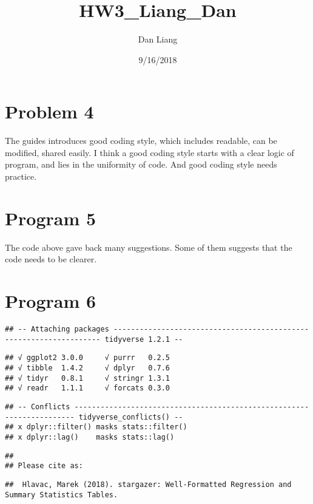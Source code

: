 \documentclass[]{article}
\title{HW3\_Liang\_Dan}
\author{Dan Liang}
\date{9/16/2018}
\begin{document}
\maketitle

\section{Problem 4}\label{problem-4}

The guides introduces good coding style, which includes readable, can be
modified, shared easily. I think a good coding style starts with a clear
logic of program, and lies in the uniformity of code. And good coding
style needs practice.

\section{Program 5}\label{program-5}

The code above gave back many suggestions. Some of them suggests that
the code needs to be clearer.

\section{Program 6}\label{program-6}

\begin{verbatim}
## -- Attaching packages ------------------------------------------------------------------- tidyverse 1.2.1 --
\end{verbatim}

\begin{verbatim}
## √ ggplot2 3.0.0     √ purrr   0.2.5
## √ tibble  1.4.2     √ dplyr   0.7.6
## √ tidyr   0.8.1     √ stringr 1.3.1
## √ readr   1.1.1     √ forcats 0.3.0
\end{verbatim}

\begin{verbatim}
## -- Conflicts ---------------------------------------------------------------------- tidyverse_conflicts() --
## x dplyr::filter() masks stats::filter()
## x dplyr::lag()    masks stats::lag()
\end{verbatim}

\begin{verbatim}
## 
## Please cite as:
\end{verbatim}

\begin{verbatim}
##  Hlavac, Marek (2018). stargazer: Well-Formatted Regression and Summary Statistics Tables.
\end{verbatim}
\end{document}
